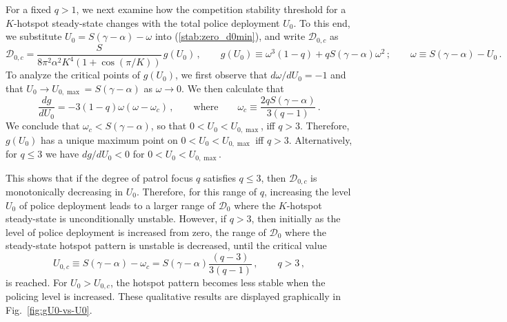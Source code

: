\documentclass{article}%
\begin{document}
For a fixed $q>1$, we next examine how the competition stability
threshold for a $K$-hotspot steady-state changes with the total police
deployment $U_{0}$.  To this end, we substitute
$U_{0}=S(\gamma-\alpha) - \omega$ into (\ref{stab:zero_d0min}),
and write ${\mathcal D}_{0,c}$ as
\begin{equation}
   {\mathcal D}_{0,c} = \frac{S}{8 \pi^2 \alpha^2 K^4 \left(1
      + \cos\left({\pi /K}\right)\right)} \, g(U_0) \,, \qquad
 g(U_0) \equiv\omega^{3}(1-q)+qS(\gamma-\alpha)\omega^{2}\,; \qquad
   \omega \equiv S(\gamma-\alpha) - U_0 \,. \label{eq:pol-D0*-g(w)}
\end{equation}
To analyze the critical points of $g(U_0)$, we first observe that 
${d\omega/dU_{0}}=-1$ and that $U_{0}\to U_{0,\max}=S(\gamma-\alpha)$ as 
$\omega \to 0$. We then calculate that
\begin{equation*}
\frac{dg}{dU_{0}}  =  -3 (1-q) \omega \left(\omega-\omega_c\right) \,,
\qquad \mbox{where}\qquad \omega_{c}\equiv 
\frac{2qS(\gamma-\alpha)}{3(q-1)}\,.
\end{equation*}
We conclude that $\omega_c<S(\gamma-\alpha)$, so that
$0<U_0<U_{0,\max}$, iff $q>3$. Therefore, $g(U_0)$ has a unique maximum
point on $0<U_0<U_{0,\max}$ iff $q>3$.  Alternatively, for $q\leq 3$
we have ${dg/dU_{0}}<0$ for $0<U_{0}<U_{0,\max}$.

This shows that if the degree of patrol focus $q$ satisfies $q\leq3$,
then ${\mathcal D}_{0,c}$ is monotonically decreasing in
$U_{0}$. Therefore, for this range of $q$, increasing the level $U_0$
of police deployment leads to a larger range of ${\mathcal D}_0$ where
the $K$-hotspot steady-state is unconditionally unstable.  However, if
$q>3$, then initially as the level of police deployment is increased
from zero, the range of ${\mathcal D}_0$ where the steady-state
hotspot pattern is unstable is decreased, until the critical value
\begin{equation}\label{stab:optim_u0}
U_{0,c} \equiv
S(\gamma-\alpha)-\omega_{c}=S(\gamma-\alpha)\frac{(q-3)}{3(q-1)} \,,
\qquad q>3 \,,
\end{equation}
is reached. For $U_0>U_{0,c}$, the hotspot pattern becomes less stable
when the policing level is increased. These qualitative results are
displayed graphically in Fig.~\ref{fig:gU0-vs-U0}.
\end{document}
